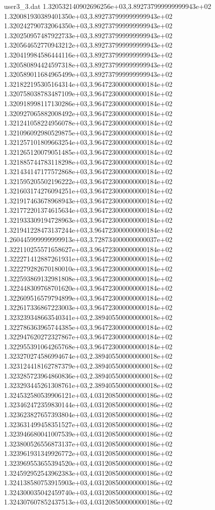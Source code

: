 \begin{filecontents}{user3_3.dat}
1.320532140902696256e+03,3.892737999999999943e+02
1.320081930389401350e+03,3.892737999999999943e+02
1.320242790732064350e+03,3.892737999999999943e+02
1.320250957487922733e+03,3.892737999999999943e+02
1.320564652770943212e+03,3.892737999999999943e+02
1.320419984586444116e+03,3.892737999999999943e+02
1.320580894424597318e+03,3.892737999999999943e+02
1.320589011684965499e+03,3.892737999999999943e+02
1.321822195305164314e+03,3.964723000000000184e+02
1.320758038783487109e+03,3.964723000000000184e+02
1.320918998117130286e+03,3.964723000000000184e+02
1.320927065882008492e+03,3.964723000000000184e+02
1.321241058224956078e+03,3.964723000000000184e+02
1.321096092980529875e+03,3.964723000000000184e+02
1.321257101809663254e+03,3.964723000000000184e+02
1.321265120079051485e+03,3.964723000000000184e+02
1.321885744783118298e+03,3.964723000000000184e+02
1.321434147177572868e+03,3.964723000000000184e+02
1.321595205502196222e+03,3.964723000000000184e+02
1.321603174276094251e+03,3.964723000000000184e+02
1.321917463678968943e+03,3.964723000000000184e+02
1.321772201374615634e+03,3.964723000000000184e+02
1.321933309194728963e+03,3.964723000000000184e+02
1.321941228473137244e+03,3.964723000000000184e+02
1.260445999999999913e+03,3.728734000000000037e+02
1.322110255571658627e+03,3.964723000000000184e+02
1.322271412887261931e+03,3.964723000000000184e+02
1.322279282670180010e+03,3.964723000000000184e+02
1.322593869132981808e+03,3.964723000000000184e+02
1.322448309768701620e+03,3.964723000000000184e+02
1.322609516579794899e+03,3.964723000000000184e+02
1.322617336867223003e+03,3.964723000000000184e+02
1.323239348663540341e+03,2.389405500000000018e+02
1.322786363965744385e+03,3.964723000000000184e+02
1.322947620272327867e+03,3.964723000000000184e+02
1.322955391064265768e+03,3.964723000000000184e+02
1.323270274586994674e+03,2.389405500000000018e+02
1.323124418162787379e+03,2.389405500000000018e+02
1.323285723964860836e+03,2.389405500000000018e+02
1.323293445261308761e+03,2.389405500000000018e+02
1.324532580539906121e+03,4.031208500000000186e+02
1.323462472359830144e+03,4.031208500000000186e+02
1.323623827657393804e+03,4.031208500000000186e+02
1.323631499458351527e+03,4.031208500000000186e+02
1.323946680041007539e+03,4.031208500000000186e+02
1.323800526556873137e+03,4.031208500000000186e+02
1.323961931349926772e+03,4.031208500000000186e+02
1.323969553655394520e+03,4.031208500000000186e+02
1.324592952543962383e+03,4.031208500000000186e+02
1.324138580753915903e+03,4.031208500000000186e+02
1.324300035042459740e+03,4.031208500000000186e+02
1.324307607852437513e+03,4.031208500000000186e+02

\end{filecontents}
